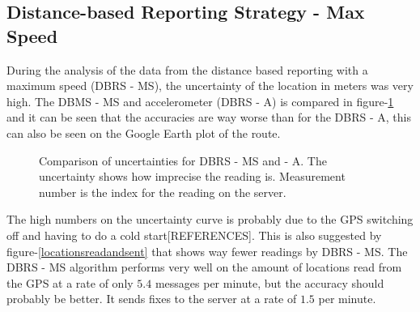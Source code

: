 \subsection{Distance-based Reporting Strategy - Max Speed}
During the analysis of the data from the distance based reporting with a maximum speed (DBRS - MS), the uncertainty of the location in meters was very high. The DBMS - MS and accelerometer (DBRS - A) is compared in figure-\ref{maxspeedaccelerometeraccuracy} and it can be seen that the accuracies are way worse than for the DBRS - A, this can also be seen on the Google Earth plot of the route.

\begin{figure}[h]

\caption{Comparison of uncertainties for DBRS - MS and - A. The uncertainty shows how imprecise the reading is. Measurement number is the index for the reading on the server.}
\label{maxspeedaccelerometeraccuracy}
\end{figure}

The high numbers on the uncertainty curve is probably due to the GPS switching off and having to do a cold start[REFERENCES]. This is also suggested by figure-\ref{locationsreadandsent} that shows way fewer readings by DBRS - MS. The DBRS - MS algorithm performs very well on the amount of locations read from the GPS at a rate of only $5.4$ messages per minute, but the accuracy should probably be better. It sends fixes to the server at a rate of $1.5$ per minute.